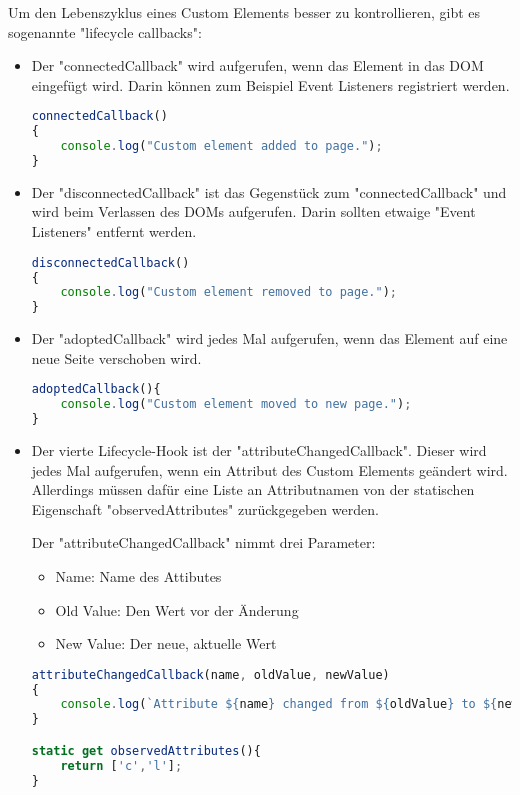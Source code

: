 Um den Lebenszyklus eines Custom Elements besser zu kontrollieren, gibt es sogenannte "lifecycle callbacks":
\begin{itemize}
    \item Der "connectedCallback" wird aufgerufen, wenn das Element in das DOM eingefügt wird. Darin können zum Beispiel Event Listeners registriert werden.
        \begin{lstlisting}[language=TypeScript,caption={"connectedCallback" Beispiel}]
connectedCallback()
{
    console.log("Custom element added to page.");
}
        \end{lstlisting}

    \item Der "disconnectedCallback" ist das Gegenstück zum "connectedCallback" und wird beim Verlassen des DOMs aufgerufen. Darin sollten etwaige "Event Listeners" entfernt werden. 
    \begin{lstlisting}[language=TypeScript,caption={"disconnectedCallback" Beispiel}]
disconnectedCallback()
{
    console.log("Custom element removed to page.");
}
    \end{lstlisting}

    \item Der "adoptedCallback" wird jedes Mal aufgerufen, wenn das Element auf eine neue Seite verschoben wird.
    \begin{lstlisting}[language=TypeScript,caption={"adoptedCallback" Beispiel}]
adoptedCallback(){
    console.log("Custom element moved to new page.");
}
    \end{lstlisting}
    \item Der vierte Lifecycle-Hook ist der "attributeChangedCallback". Dieser wird jedes Mal aufgerufen, wenn ein Attribut des Custom Elements geändert wird. Allerdings müssen dafür eine Liste an Attributnamen von der statischen Eigenschaft "observedAttributes" zurückgegeben werden. 
    
    Der "attributeChangedCallback" nimmt drei Parameter:
    \begin{itemize}
        \item 	Name: Name des Attibutes
        \item 	Old Value: Den Wert vor der Änderung
        \item 	New Value: Der neue, aktuelle Wert 
    \end{itemize}

    \begin{lstlisting}[language=TypeScript,caption={"attributeChangedCallback" Beispiel}]
attributeChangedCallback(name, oldValue, newValue)
{
    console.log(`Attribute ${name} changed from ${oldValue} to ${newValue}.`);
}

static get observedAttributes(){
    return ['c','l'];
}
    \end{lstlisting}
\end{itemize}


